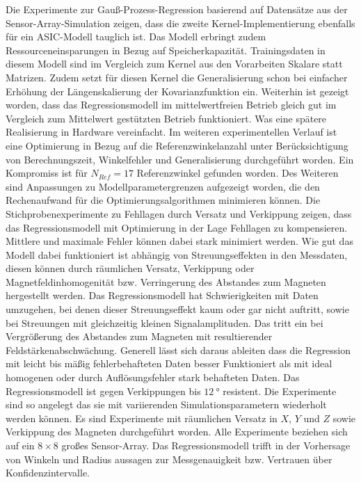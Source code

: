 Die Experimente zur Gauß-Prozess-Regression basierend auf Datensätze aus der Sensor-Array-Simulation zeigen, dass die zweite Kernel-Implementierung ebenfalls für ein ASIC-Modell tauglich ist. Das Modell erbringt zudem Ressourceneinsparungen in Bezug auf Speicherkapazität. Trainingsdaten in diesem Modell sind im Vergleich zum Kernel aus den Vorarbeiten Skalare statt Matrizen. Zudem setzt für diesen Kernel die Generalisierung schon bei einfacher Erhöhung der Längenskalierung der Kovarianzfunktion ein. Weiterhin ist gezeigt worden, dass das Regressionsmodell im mittelwertfreien Betrieb gleich gut im Vergleich zum Mittelwert gestützten Betrieb funktioniert. Was eine spätere Realisierung in Hardware vereinfacht. Im weiteren experimentellen Verlauf ist eine Optimierung in Bezug auf die Referenzwinkelanzahl unter Berücksichtigung von Berechnungszeit, Winkelfehler und Generalisierung durchgeführt worden. Ein Kompromiss ist für $N_{Ref} = 17$ Referenzwinkel gefunden worden. Des Weiteren sind Anpassungen zu Modellparametergrenzen aufgezeigt worden, die den Rechenaufwand für die Optimierungsalgorithmen minimieren können. Die Stichprobenexperimente zu Fehllagen durch Versatz und Verkippung zeigen, dass das Regressionsmodell mit Optimierung in der Lage Fehllagen zu kompensieren. Mittlere und maximale Fehler können dabei stark minimiert werden. Wie gut das  Modell dabei funktioniert ist abhängig von Streuungseffekten in den Messdaten, diesen können durch räumlichen Versatz, Verkippung oder Magnetfeldinhomogenität bzw. Verringerung des Abstandes zum Magneten hergestellt werden. Das Regressionsmodell hat Schwierigkeiten mit Daten umzugehen, bei denen dieser Streuungseffekt kaum oder gar nicht auftritt, sowie bei Streuungen mit gleichzeitig kleinen Signalamplituden. Das tritt ein bei Vergrößerung des Abstandes zum Magneten mit resultierender Feldstärkenabschwächung. Generell lässt sich daraus ableiten dass die Regression mit leicht bis mäßig fehlerbehafteten Daten besser Funktioniert als mit ideal homogenen oder durch Auflösungsfehler stark behafteten Daten. Das Regressionsmodell ist gegen Verkippungen bis $\SI{12}{\degree}$ resistent. Die Experimente sind so angelegt das sie mit variierenden Simulationsparametern wiederholt werden können. Es sind Experimente mit räumlichen Versatz in $X$, $Y$ und $Z$ sowie Verkippung des Magneten durchgeführt worden. Alle Experimente beziehen sich auf ein $8 \times 8$ großes Sensor-Array. Das Regressionsmodell trifft in der Vorhersage von Winkeln und Radius aussagen zur Messgenauigkeit bzw. Vertrauen über Konfidenzintervalle.


